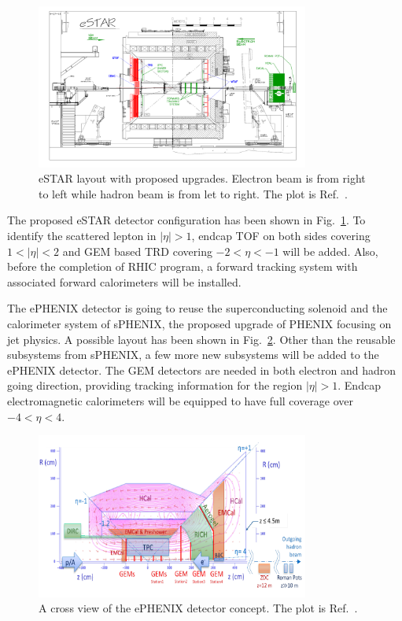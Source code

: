 \begin{figure}
\centering
\includegraphics[width=0.8\textwidth]{plots/chpt4/eSTAR_layout.png}
\caption[Layout of eSTAR detector concept]{
eSTAR layout with proposed upgrades. Electron beam is from right to left while hadron beam is from let to right. The plot is Ref.~\cite{star_LoI}.}
\label{fig:eSTAR_layout}
\end{figure}

The proposed eSTAR detector configuration has been shown in
Fig.~\ref{fig:eSTAR_layout}. To identify the scattered lepton in $|\eta|>1$,
endcap TOF on both sides covering $1<|\eta|<2$ and GEM based TRD covering
$-2<\eta<-1$ will be added. Also, before the completion of RHIC program, a
forward tracking system with associated forward calorimeters will be installed.

The ePHENIX detector is going to reuse the superconducting solenoid and the
calorimeter system of sPHENIX, the proposed upgrade of PHENIX focusing on jet
physics. A possible layout has been shown in Fig.~\ref{fig:ePhenix_layout}.
Other than the reusable subsystems from sPHENIX, a few more new subsystems will
be added to the ePHENIX detector. The GEM detectors are needed in both electron
and hadron going direction, providing tracking information for the region
$|\eta|>1$. Endcap electromagnetic calorimeters will be equipped to have full
coverage over $-4<\eta<4$.
\begin{figure}
\centering
\includegraphics[width=0.8\textwidth]{plots/chpt4/ePhenix_layout.png}
\caption[Layout of ePHENIX detector concept]{
A cross view of the ePHENIX detector concept. The plot is Ref.~\cite{Adare:2014aaa}.}
\label{fig:ePhenix_layout}
\end{figure}

